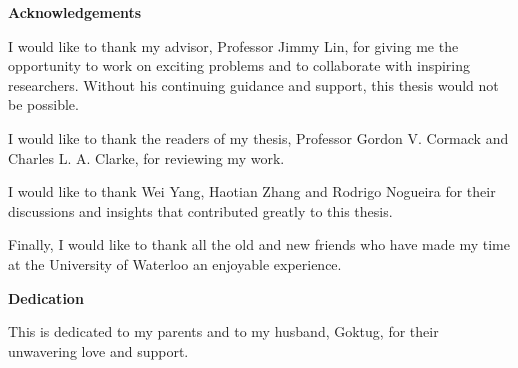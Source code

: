 \cleardoublepage


\begin{center}\textbf{Acknowledgements}\end{center}

I would like to thank my advisor, Professor Jimmy Lin, for giving me the opportunity to work on exciting problems and to collaborate with inspiring researchers.
Without his continuing guidance and support, this thesis would not be possible.

I would like to thank the readers of my thesis, Professor Gordon V. Cormack and Charles L. A. Clarke, for reviewing my work.

I would like to thank Wei Yang, Haotian Zhang and Rodrigo Nogueira for their discussions and insights that contributed greatly to this thesis.

Finally, I would like to thank all the old and new friends who have made my time at the University of Waterloo an enjoyable experience.

\cleardoublepage


\begin{center}\textbf{Dedication}\end{center}

This is dedicated to my parents and to my husband, Goktug, for their unwavering love and support.

\cleardoublepage

\renewcommand\contentsname{Table of Contents}
\tableofcontents
\cleardoublepage
{}    %

\listoftables
\cleardoublepage
{}		%

\listoffigures
\cleardoublepage
{}		%

\printglossaries
\cleardoublepage
{}		%


